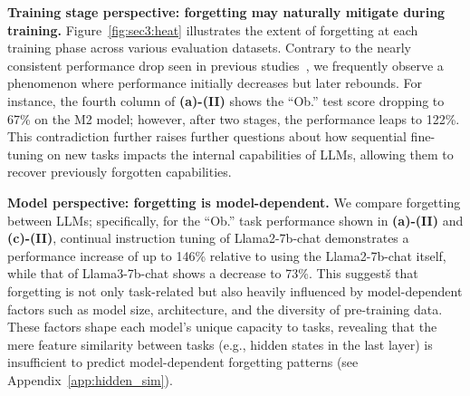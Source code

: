 \textbf{Training stage perspective: forgetting may naturally mitigate during training.} Figure~\ref{fig:sec3:heat} illustrates the extent of forgetting at each training phase across various evaluation datasets. Contrary to the nearly consistent performance drop seen in previous studies~\citep{luo2024empirical, wu2022pretrained}, we frequently observe a phenomenon where performance initially decreases but later rebounds. For instance, the fourth column of \textbf{(a)-(II)} shows the “Ob.” test score dropping to 67\% on the M2 model; however, after two stages, the performance leaps to 122\%. 
This contradiction further raises further questions about how sequential fine-tuning on new tasks impacts the internal capabilities of LLMs, allowing them to recover previously forgotten capabilities.



\textbf{Model perspective: forgetting is model-dependent.} We compare forgetting between LLMs;
specifically, for the “Ob.” task performance shown in \textbf{(a)-(II)} and \textbf{(c)-(II)}, continual instruction tuning of Llama2-7b-chat demonstrates a performance increase of up to 146\% relative to using the Llama2-7b-chat itself, while that of Llama3-7b-chat shows a decrease to 73\%. 
This suggestš that forgetting is not only task-related but also heavily influenced by model-dependent factors such as model size, architecture, and the diversity of pre-training data.
These factors shape each model's unique capacity to tasks, revealing that the mere feature similarity between tasks (e.g., hidden states in the last layer) is insufficient to predict model-dependent forgetting patterns (see Appendix~\ref{app:hidden_sim}).
